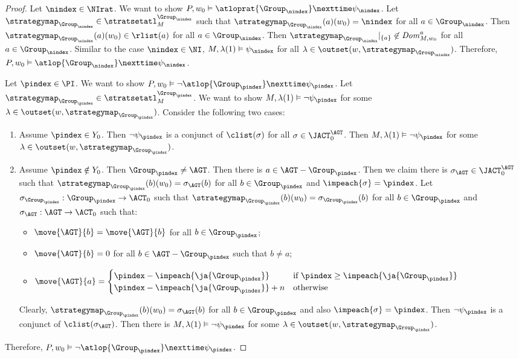 \begin{proof}
  Let $\nindex\in \NIrat$. We want to show $P,w_0\vDash \atloprat{\Group_\nindex}\nexttime \psi_\nindex $.  
  Let $\strategymap_{\Group_\nindex}\in \stratsetatl^{\Group_\nindex}_{M}$ such that 
  $\strategymap_{\Group_\nindex}(a)(w_0)=\nindex$ for all $a\in \Group_\nindex$. Then $\strategymap_{\Group_\nindex}(a)(w_0)\in \rlist(a)$ for all  $a\in \Group_\nindex$. Then $\strategymap_{\Group_\nindex}|_{\{a\}}\not \in \mathit{Dom}_{M,w_0}^a$ for all $a\in \Group_\nindex$.  
  Similar to the case $\nindex\in \NI$, $M,\lambda(1)\vDash \psi_\nindex$ for all $\lambda\in \outset(w, \strategymap_{\Group_\nindex})$. Therefore, $P,w_0\vDash \atlop{\Group_\nindex}\nexttime \psi_\nindex $.

  Let $\pindex\in \PI$. We want to show $P,w_0\vDash \neg \atlop{\Group_\pindex}\nexttime \psi_\pindex $. Let $\strategymap_{\Group_\pindex}\in \stratsetatl^{\Group_\pindex}_{M}$. We want to show $M,\lambda(1)\vDash \neg \psi_\pindex$ for some $\lambda\in \outset(w, \strategymap_{\Group_\pindex})$. Consider the following two cases:


  \begin{enumerate}[label={Case \arabic*}]
  \item Assume $\pindex\in Y_0$. Then $\neg \psi_\pindex$ is a conjunct of $\clist(\sigma)$ for all $\sigma\in\JACT^{\AGT}_0$. Then $M,\lambda(1)\vDash \neg \psi_\pindex$ for some $\lambda\in \outset(w, \strategymap_{\Group_\pindex})$.
  \item Assume $\pindex\notin Y_0$. Then $\Group_\pindex\neq \AGT$. Then there is $a\in \AGT-\Group_\pindex$. Then we claim there is $\sigma_\AGT\in\JACT^{\AGT}_0$ such that $\strategymap_{\Group_\pindex}(b)(w_0)=\sigma_\AGT(b)$ for all $b\in \Group_\pindex$ and $\impeach{\sigma}=\pindex$. 
  Let $\sigma_{\Group_\pindex}:\Group_\pindex\to \ACT_0$ such that $\strategymap_{\Group_\pindex}(b)(w_0)=\sigma_{\Group_\pindex}(b)$ for all $b\in \Group_\pindex$ and $\sigma_{\AGT}:\AGT\to \ACT_0$ such that:
  \begin{itemize}
    \item  $\move{\AGT}{b}=\move{\AGT}{b}$ for all $b\in \Group_\pindex$;
    \item $\move{\AGT}{b}=0$ for all $b \in \AGT-\Group_\pindex$ such that $b\neq a$;
    \item $\move{\AGT}{a}=\begin{cases}
    \pindex-\impeach{\ja{\Group_\pindex}} & \text{if } \pindex \geq \impeach{\ja{\Group_\pindex}} \\
    \pindex-\impeach{\ja{\Group_\pindex}}+n & \text{otherwise}
    \end{cases}$
  \end{itemize}
 Clearly, $\strategymap_{\Group_\pindex}(b)(w_0)=\sigma_\AGT(b)$ for all $b\in \Group_\pindex$ and also $\impeach{\sigma}=\pindex$. Then $\neg \psi_\pindex$ is a conjunct of $\clist(\sigma_\AGT)$. Then there is $M,\lambda(1)\vDash \neg \psi_\pindex$ for some $\lambda\in \outset(w, \strategymap_{\Group_\pindex})$.
  \end{enumerate}
  Therefore, $P,w_0\vDash \neg \atlop{\Group_\pindex}\nexttime \psi_\pindex $.


\end{proof}
